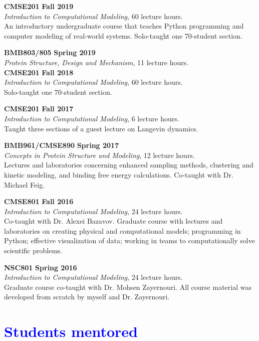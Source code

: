 \documentclass[margin,line]{res}
\begin{document}
\begin{resume}
{\bf CMSE201} \hfill {\bf Fall 2019} \\
\emph{Introduction to Computational Modeling}, 60 lecture hours.\\
An introductory undergraduate course that teaches Python programming and computer modeling of real-world systems. Solo-taught one 70-student section.

{\bf BMB803/805} \hfill {\bf Spring 2019} \\
\emph{Protein Structure, Design and Mechanism}, 11 lecture hours.\\

{\bf CMSE201} \hfill {\bf Fall 2018} \\
\emph{Introduction to Computational Modeling}, 60 lecture hours.\\
Solo-taught one 70-student section.

{\bf CMSE201} \hfill {\bf Fall 2017} \\
\emph{Introduction to Computational Modeling}, 6 lecture hours.\\
Taught three sections of a guest lecture on Langevin dynamics.

{\bf BMB961/CMSE890} \hfill {\bf Spring 2017} \\
\emph{Concepts in Protein Structure and Modeling}, 12 lecture hours.\\
Lectures and laboratories concerning enhanced sampling methods, clustering and kinetic modeling, and binding free energy calculations. Co-taught with Dr. Michael Feig.

{\bf CMSE801} \hfill {\bf Fall 2016} \\
\emph{Introduction to Computational Modeling}, 24 lecture hours.\\
Co-taught with Dr. Alexei Bazavov.
Graduate course with lectures and laboratories on creating physical and computational models; programming in Python; effective visualization of data; working in teams to computationally solve scientific problems.

{\bf NSC801} \hfill {\bf Spring 2016} \\
\emph{Introduction to Computational Modeling}, 24 lecture hours.\\
Graduate course co-taught with Dr. Mohsen Zayernouri.
All course material was developed from scratch by myself and Dr. Zayernouri.

\section{\sc \textcolor{blue}{ Students mentored }}


\end{resume}
\end{document}
